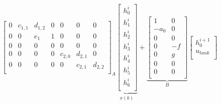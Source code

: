 \begin{equation}
\begin{aligned}
{\begin{bmatrix}
        0       &c_{1,1}& d_{1,2}& 0     &0         &0       &0\\
        0       & 0     & e_1    & 1     &0         &0          &0           \\
        0       & 0     &   0    & 0     & 0        &0          &0        \\
        0       & 0     &  0     & 0    &c_{2,0}    &  d_{2,1} &0  \\
         0       & 0     &  0    & 0    &0          &c_{2,1}    &  d_{2,2}   \\
        \end{bmatrix}}_{A}
            \underbrace{\begin{bmatrix}
        h_{0}^{i} \\
        h_{1}^{i} \\
        h_{2}^{i} \\
        h_{3}^{i}\\
        h_{4}^{i}\\
        h_{5}^{i}\\
          h_{6}^{i}\\
        \end{bmatrix}}_{x(k)}
    +  \underbrace{\begin{bmatrix}
         1 & 0\\
         -a_0& 0 \\
         0 & 0\\
          0& -f \\
          0& g \\ 
          0& 0 \\
          0& 0 \\
        \end{bmatrix}}_{B}
        \begin{bmatrix}
        h_0^{i+1}\\
        u_{tank} \\
        \end{bmatrix}
    \end{aligned}
\end{equation}



